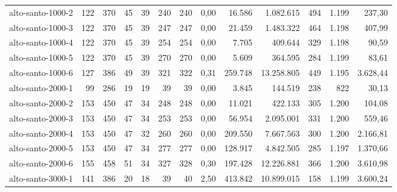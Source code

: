 \begin{table}[ht!]
{\begin{tabular}{lrrrrrrrrrrrr}
			\rowcolor{rowgrey}alto-santo-1000-2                                                       & 122 & 370   & 45  & 39 & 240 & 240 & 0,00  & 16.586  & 1.082.615  & 494   & 1.199 & 237,30   \\
			\rowcolor{rowgrey}alto-santo-1000-3                                                       & 122 & 370   & 45  & 39 & 247 & 247 & 0,00  & 21.459  & 1.483.322  & 464   & 1.198 & 407,99   \\
			\rowcolor{rowgrey}alto-santo-1000-4                                                       & 122 & 370   & 45  & 39 & 254 & 254 & 0,00  & 7.705   & 409.644    & 329   & 1.198 & 90,59    \\
			\rowcolor{rowgrey}alto-santo-1000-5                                                       & 122 & 370   & 45  & 39 & 270 & 270 & 0,00  & 5.609   & 364.595    & 284   & 1.199 & 83,61    \\
			\rowcolor{rowlight}alto-santo-1000-6                                                      & 127 & 386   & 49  & 39 & 321 & 322 & 0,31  & 259.748 & 13.258.805 & 449   & 1.195 & 3.628,44 \\
			\rowcolor{rowgrey}alto-santo-2000-1                                                       & 99  & 286   & 19  & 19 & 39  & 39  & 0,00  & 3.845   & 144.519    & 238   & 822   & 30,13    \\
			\rowcolor{rowgrey}alto-santo-2000-2                                                       & 153 & 450   & 47  & 34 & 248 & 248 & 0,00  & 11.021  & 422.133    & 305   & 1.200 & 104,08   \\
			\rowcolor{rowgrey}alto-santo-2000-3                                                       & 153 & 450   & 47  & 34 & 253 & 253 & 0,00  & 56.954  & 2.095.001  & 331   & 1.200 & 559,46   \\
			\rowcolor{rowgrey}alto-santo-2000-4                                                       & 153 & 450   & 47  & 32 & 260 & 260 & 0,00  & 209.550 & 7.667.563  & 300   & 1.200 & 2.166,81 \\
			\rowcolor{rowgrey}alto-santo-2000-5                                                       & 153 & 450   & 47  & 34 & 277 & 277 & 0,00  & 128.917 & 4.842.505  & 285   & 1.197 & 1.370,66 \\
			\rowcolor{rowlight}alto-santo-2000-6                                                      & 155 & 458   & 51  & 34 & 327 & 328 & 0,30  & 197.428 & 12.226.881 & 366   & 1.200 & 3.610,98 \\
			\rowcolor{rowlight}alto-santo-3000-1                                                      & 141 & 386   & 20  & 18 & 39  & 40  & 2,50  & 413.842 & 10.899.015 & 158   & 1.199 & 3.600,24 \\

\end{tabular}}
\end{table}
